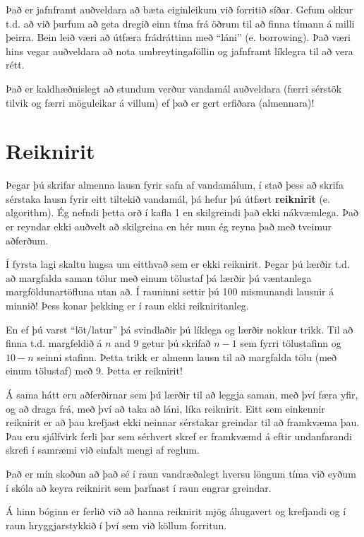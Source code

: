 Það er jafnframt auðveldara að bæta eiginleikum við forritið síðar.
Gefum okkur t.d. að við þurfum að geta dregið einn tíma frá öðrum til að finna tímann á milli þeirra.
Bein leið væri að útfæra frádráttinn með ``láni'' (e. borrowing).
Það væri hins vegar auðveldara að nota umbreytingaföllin og jafnframt líklegra til að vera rétt.

Það er kaldhæðnislegt að stundum verður vandamál auðveldara (færri sérstök tilvik og færri möguleikar á villum) ef það er gert erfiðara (almennara)!

\section{Reiknirit}
\label{algorithm}

Þegar þú skrifar almenna lausn fyrir safn af vandamálum, í stað þess að skrifa sérstaka lausn fyrir eitt tiltekið vandamál, þá hefur þú útfært 
{\bf reiknirit} (e. algorithm).
Ég nefndi þetta orð í kafla 1 en skilgreindi það ekki nákvæmlega.
Það er reyndar ekki auðvelt að skilgreina en hér mun ég reyna það með tveimur aðferðum.

Í fyrsta lagi skaltu hugsa um eitthvað sem er ekki reiknirit.
Þegar þú lærðir t.d. að margfalda saman tölur með einum tölustaf þá lærðir þú væntanlega margföldunartöfluna utan að.
Í rauninni settir þú 100 mismunandi lausnir á minnið!
Þess konar þekking er í raun ekki reikniritanleg.

En ef þú varst ``löt/latur'' þá svindlaðir þú líklega og lærðir nokkur trikk.
Til að finna t.d. margfeldið á $n$ and 9 getur þú skrifað $n-1$ sem fyrri tölustafinn og $10-n$ seinni stafinn.
Þetta trikk er almenn lausn til að margfalda tölu (með einum tölustaf) með 9.
Þetta er reiknirit!

Á sama hátt eru aðferðirnar sem þú lærðir til að leggja saman, með því færa yfir, og að draga frá, með því að taka að láni, líka reiknirit.
Eitt sem einkennir reiknirit er að þau krefjast ekki neinnar sérstakar greindar til að framkvæma þau.
Þau eru sjálfvirk ferli þar sem sérhvert skref er framkvæmd á eftir undanfarandi skrefi í samræmi við einfalt mengi af reglum.

Það er mín skoðun að það sé í raun vandræðalegt hversu löngum tíma við eyðum í skóla að keyra reiknirit sem þarfnast í raun engrar greindar.

Á hinn bóginn er ferlið við að hanna reiknirit mjög áhugavert og krefjandi og í raun hryggjarstykkið í því sem við köllum forritun.

